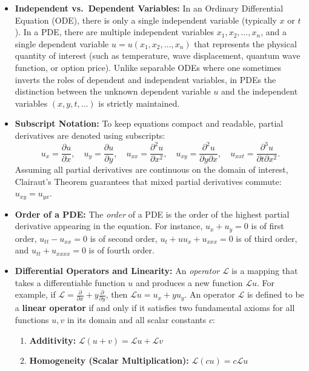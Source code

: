 \documentclass[11pt,a4paper]{article}
\begin{document}
\begin{itemize}
    \item \textbf{Independent vs.\ Dependent Variables:} In an Ordinary Differential Equation (ODE), there is only a single independent variable (typically $x$ or $t$). In a PDE, there are multiple independent variables $x_1, x_2, \dots, x_n$, and a single dependent variable $u = u(x_1, x_2, \dots, x_n)$ that represents the physical quantity of interest (such as temperature, wave displacement, quantum wave function, or option price). Unlike separable ODEs where one sometimes inverts the roles of dependent and independent variables, in PDEs the distinction between the unknown dependent variable $u$ and the independent variables $(x, y, t, \dots)$ is strictly maintained.
    \item \textbf{Subscript Notation:} To keep equations compact and readable, partial derivatives are denoted using subscripts:
    \[
        u_x = \frac{\partial u}{\partial x}, \quad u_y = \frac{\partial u}{\partial y}, \quad u_{xx} = \frac{\partial^2 u}{\partial x^2}, \quad u_{xy} = \frac{\partial^2 u}{\partial y \partial x}, \quad u_{xxt} = \frac{\partial^3 u}{\partial t \partial x^2}.
    \]
    Assuming all partial derivatives are continuous on the domain of interest, Clairaut's Theorem guarantees that mixed partial derivatives commute: $u_{xy} = u_{yx}$.
    \item \textbf{Order of a PDE:} The \emph{order} of a PDE is the order of the highest partial derivative appearing in the equation. For instance, $u_x + u_y = 0$ is of first order, $u_{tt} - u_{xx} = 0$ is of second order, $u_t + u u_x + u_{xxx} = 0$ is of third order, and $u_{tt} + u_{xxxx} = 0$ is of fourth order.
    \item \textbf{Differential Operators and Linearity:} An \emph{operator} $\mathcal{L}$ is a mapping that takes a differentiable function $u$ and produces a new function $\mathcal{L}u$. For example, if $\mathcal{L} = \frac{\partial}{\partial x} + y\frac{\partial}{\partial y}$, then $\mathcal{L}u = u_x + y u_y$. An operator $\mathcal{L}$ is defined to be a \textbf{linear operator} if and only if it satisfies two fundamental axioms for all functions $u, v$ in its domain and all scalar constants $c$:
    \begin{enumerate}
        \item \textbf{Additivity:} $\mathcal{L}(u + v) = \mathcal{L}u + \mathcal{L}v$
        \item \textbf{Homogeneity (Scalar Multiplication):} $\mathcal{L}(cu) = c\mathcal{L}u$

\end{enumerate}
\end{itemize}
\end{document}

